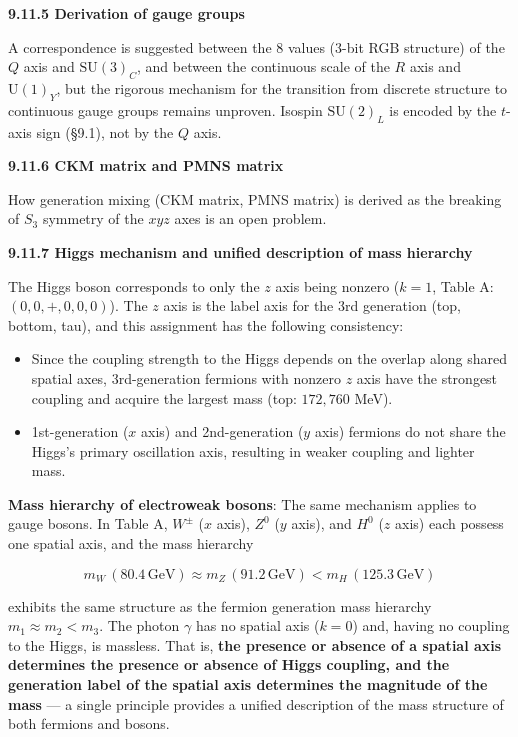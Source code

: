\documentclass[
  a4paper,11pt]{article}
\providecommand{\tightlist}{%
  \setlength{\itemsep}{0pt}\setlength{\parskip}{0pt}}
\theoremstyle{definition}
\theoremstyle{remark}
\begin{document}
\textbf{9.11.5 Derivation of gauge groups}

A correspondence is suggested between the 8 values (3-bit RGB structure)
of the \(Q\) axis and \(\mathrm{SU}(3)_C\), and between the continuous
scale of the \(R\) axis and \(\mathrm{U}(1)_Y\), but the rigorous
mechanism for the transition from discrete structure to continuous gauge
groups remains unproven. Isospin \(\mathrm{SU}(2)_L\) is encoded by the
\(t\)-axis sign (§9.1), not by the \(Q\) axis.

\textbf{9.11.6 CKM matrix and PMNS matrix}

How generation mixing (CKM matrix, PMNS matrix) is derived as the
breaking of \(S_3\) symmetry of the \(xyz\) axes is an open problem.

\textbf{9.11.7 Higgs mechanism and unified description of mass
hierarchy}

The Higgs boson corresponds to only the \(z\) axis being nonzero
(\(k = 1\), Table A: \((0, 0, +, 0, 0, 0)\)). The \(z\) axis is the
label axis for the 3rd generation (top, bottom, tau), and this
assignment has the following consistency:

\begin{itemize}
\tightlist
\item
  Since the coupling strength to the Higgs depends on the overlap along
  shared spatial axes, 3rd-generation fermions with nonzero \(z\) axis
  have the strongest coupling and acquire the largest mass (top:
  \(172{,}760\) MeV).
\item
  1st-generation (\(x\) axis) and 2nd-generation (\(y\) axis) fermions
  do not share the Higgs's primary oscillation axis, resulting in weaker
  coupling and lighter mass.
\end{itemize}

\textbf{Mass hierarchy of electroweak bosons}: The same mechanism
applies to gauge bosons. In Table A, \(W^\pm\) (\(x\) axis), \(Z^0\)
(\(y\) axis), and \(H^0\) (\(z\) axis) each possess one spatial axis,
and the mass hierarchy

\[m_W \,(80.4\,\text{GeV}) \approx m_Z \,(91.2\,\text{GeV}) < m_H \,(125.3\,\text{GeV})\]

exhibits the same structure as the fermion generation mass hierarchy
\(m_1 \approx m_2 < m_3\). The photon \(\gamma\) has no spatial axis
(\(k = 0\)) and, having no coupling to the Higgs, is massless. That is,
\textbf{the presence or absence of a spatial axis determines the
presence or absence of Higgs coupling, and the generation label of the
spatial axis determines the magnitude of the mass} --- a single
principle provides a unified description of the mass structure of both
fermions and bosons.
\end{document}
